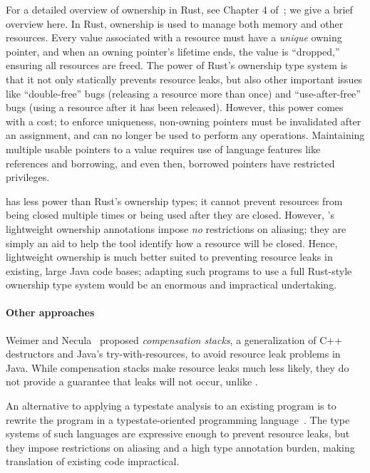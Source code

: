 For a detailed overview of ownership in Rust, see Chapter 4
of~\cite{klabnik2018rust}; we give a brief overview here.  In Rust, ownership is
used to manage both memory and other resources.  Every value associated with a
resource must have a \emph{unique} owning pointer, and when an owning pointer's
lifetime ends, the value is ``dropped,'' ensuring all resources are freed.  The
power of Rust's ownership type system is that it not only statically prevents
resource leaks, but also other important issues like ``double-free'' bugs
(releasing a resource more than once) and ``use-after-free'' bugs (using a
resource after it has been released). However, this power comes with a cost; to
enforce uniqueness, non-owning pointers must be invalidated after an assignment,
and can no longer be used to perform any operations.  Maintaining multiple
usable pointers to a value requires use of language features like references and
borrowing, and even then, borrowed pointers have restricted privileges.

\Tool has less power than Rust's ownership types; it cannot prevent resources
from being closed multiple times or being used after they are closed.  However,
\Tool's lightweight ownership annotations impose \emph{no} restrictions on
aliasing; they are simply an aid to help the tool identify how a resource will
be closed.  Hence, lightweight ownership is much better suited to preventing
resource leaks in existing, large Java code bases; adapting such programs to use
a full Rust-style ownership type system would be an enormous and impractical
undertaking.

\paragraph{Other approaches} Weimer and Necula~\cite{WeimerN04} proposed
\emph{compensation stacks}, a generalization of C++ destructors and Java's
try-with-resources, to avoid resource leak problems in Java.  While
compensation stacks make resource leaks much less likely, they do not provide a
guarantee that leaks will not occur, unlike \Tool.

An alternative to applying a typestate analysis to an existing program
is to rewrite the program in a typestate-oriented programming
language~\cite{AldrichSSS2009,garcia2014typestate}.  The type systems of such
languages are expressive enough to prevent resource leaks, but they impose
restrictions on aliasing and a high type annotation burden, making translation
of existing code impractical.





